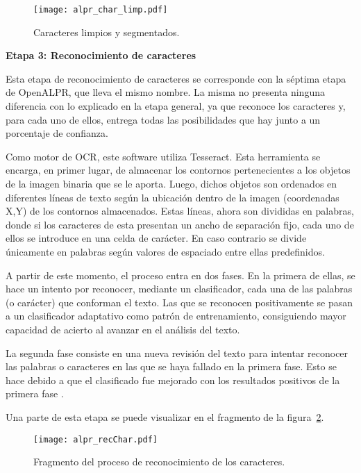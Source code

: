 \begin{figure}[H]
	\centering
	\texttt{[image: alpr\_char\_limp.pdf]}
	\caption{Caracteres limpios y segmentados.}
	\label{fig:img_char_limp}
\end{figure}

\quad

\noindent \textbf{Etapa 3: Reconocimiento de caracteres}

Esta etapa de reconocimiento de caracteres se corresponde con la séptima etapa de OpenALPR, que lleva el mismo nombre. La misma no presenta ninguna diferencia con lo explicado en la etapa general, ya que reconoce los caracteres y, para cada uno de ellos, entrega todas las posibilidades que hay junto a un porcentaje de confianza.

Como motor de OCR, este software utiliza Tesseract. Esta herramienta se encarga, en primer lugar, de almacenar los contornos pertenecientes a los objetos de la imagen binaria que se le aporta. Luego, dichos objetos son ordenados en diferentes líneas de texto según la ubicación dentro de la imagen (coordenadas X,Y) de los contornos almacenados. Estas líneas, ahora son divididas en palabras, donde si los caracteres de esta presentan un ancho de separación fijo, cada uno de ellos se introduce en una celda de carácter. En caso contrario se divide únicamente en palabras según valores de espaciado entre ellas predefinidos.

A partir de este momento, el proceso entra en dos fases. En la primera de ellas, se hace un intento por reconocer, mediante un clasificador, cada una de las palabras (o carácter) que conforman el texto. Las que se reconocen positivamente se pasan a un clasificador adaptativo como patrón de entrenamiento, consiguiendo mayor capacidad de acierto al avanzar en el análisis del texto.

La segunda fase consiste en una nueva revisión del texto para intentar reconocer las palabras o caracteres en las que se haya fallado en la primera fase. Esto se hace debido a que el clasificado fue mejorado con los resultados positivos de la primera fase \cite{politecnicacartagena}.

Una parte de esta etapa se puede visualizar en el fragmento de la figura~\ref{fig:img_rec_char}.

\begin{figure}[H]
	\centering
	\texttt{[image: alpr\_recChar.pdf]}
	\caption{Fragmento del proceso de reconocimiento de los caracteres.}
	\label{fig:img_rec_char}
\end{figure}


